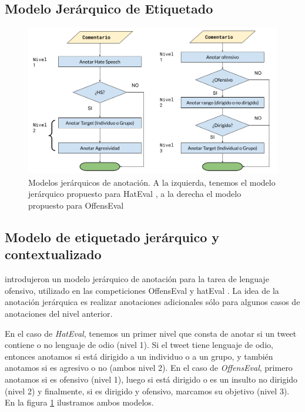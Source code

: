\subsection{Modelo Jerárquico de Etiquetado}



\begin{figure}
    \centering
    \includegraphics[width=\textwidth]{img/modelosjerarquicos.png}
    \caption{Modelos jerárquicos de anotación. A la izquierda, tenemos el modelo jerárquico propuesto para HatEval \cite{hateval2019semeval}, a la derecha el modelo propuesto para OffensEval \cite{zampieri2019semeval2019}}
    \label{fig:modelos_offenseval_hateval}
\end{figure}

\subsection{Modelo de etiquetado jerárquico y contextualizado}

\citet{zampieri2019predicting} introdujeron un modelo jerárquico de anotación para la tarea de lenguaje ofensivo, utilizado en las competiciones OffensEval \cite{zampieri2019semeval2019} y hatEval \cite{hateval2019semeval}. La idea de la anotación jerárquica es realizar anotaciones adicionales sólo para algunos casos de anotaciones del nivel anterior.

En el caso de \emph{HatEval}, tenemos un primer nivel que consta de anotar si un tweet contiene o no lenguaje de odio (nivel 1). Si el tweet tiene lenguaje de odio, entonces anotamos si está dirigido a un individuo o a un grupo, y también anotamos si es agresivo o no (ambos nivel 2). En el caso de \emph{OffensEval}, primero anotamos si es ofensivo (nivel 1), luego si está dirigido o es un insulto no dirigido (nivel 2) y finalmente, si es dirigido y ofensivo, marcamos su objetivo (nivel 3). En la figura \ref{fig:modelos_offenseval_hateval} ilustramos ambos modelos.


